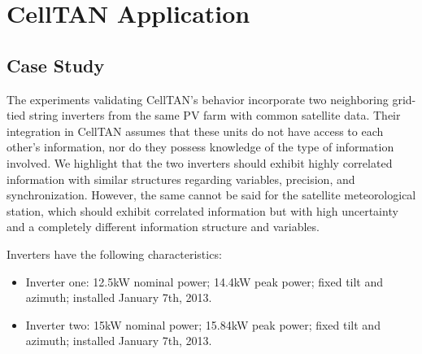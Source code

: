 \chapter{CellTAN Application} \label{chap:chap5}


\section{Case Study} \label{sec:case_study}


The experiments validating CellTAN's behavior incorporate two neighboring grid-tied string inverters from the same PV farm with common satellite data.
Their integration in CellTAN assumes that these units do not have access to each other's information, nor do they possess knowledge of the type of information involved. We highlight that the two inverters should exhibit highly correlated information with similar structures regarding variables, precision, and synchronization. However, the same cannot be said for the satellite meteorological station, which should exhibit correlated information but with high uncertainty and a completely different information structure and variables.

Inverters have the following characteristics:

\begin{itemize}
    \item Inverter one: 12.5kW nominal power; 14.4kW peak power; fixed tilt and azimuth; installed January 7th, 2013.
    \item Inverter two: 15kW nominal power; 15.84kW peak power; fixed tilt and azimuth; installed January 7th, 2013.
\end{itemize}

